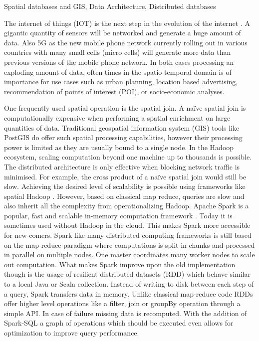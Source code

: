\documentclass[conference]{IEEEtran}
\begin{document}
Spatial databases and GIS, Data Architecture, Distributed databases

The internet of things (IOT) is the next step in the evolution of the internet \cite{Lin2017}.
A gigantic quantity of sensors will be networked and generate a huge amount of data.
Also 5G as the new mobile phone network currently rolling out in various countries with many small cells (micro cells) will generate more data than previous versions of the mobile phone network.
In both cases processing an exploding amount of  data, often times in the spatio-temporal domain is of importance for use cases such as urban planning, location based advertising, recommendation of points of interest (POI), or socio-economic analyses.

One frequently used spatial operation is the spatial join. 
A naïve spatial join is
computationally expensive when performing a spatial enrichment on large quantities of data. Traditional geospatial information system (GIS) tools like PostGIS do offer such spatial processing capabilities,
however their processing power is limited as they are usually bound to a single node.
In the Hadoop ecosystem, scaling computation beyond one machine up to thousands is possible.
The distributed architecture is only effective when blocking network traffic is minimised. For example, the cross product of a naïve spatial join would still be slow.
Achieving the desired level of scalability is possible using frameworks like spatial Hadoop \cite{Eldawy2015}.
However, based on classical map reduce, queries are slow and also inherit all the complexity from operationalizing Hadoop.
Apache Spark is a popular, fast and scalable in-memory computation framework \cite{Zaharia2012}.
Today it is sometimes used without Hadoop in the cloud. 
This makes Spark more accessible for new-comers.
Spark like many distributed computing frameworks is still based on the map-reduce paradigm where computations is split in chunks and processed in parallel on multiple nodes.
One master coordinates many worker nodes to scale out computation.
What makes Spark improve upon the old implementation though is the usage of resilient distributed datasets (RDD) which behave similar to a local Java or Scala collection.
Instead of writing to disk between each step of a query, Spark transfers data in memory.
Unlike classical map-reduce code RDDs offer higher level operations like a filter, join or groupBy operation through a simple API.
In case of failure missing data is recomputed.
With the addition of Spark-SQL a graph of operations which should be executed even allows for  optimization to improve query performance.
\end{document}
